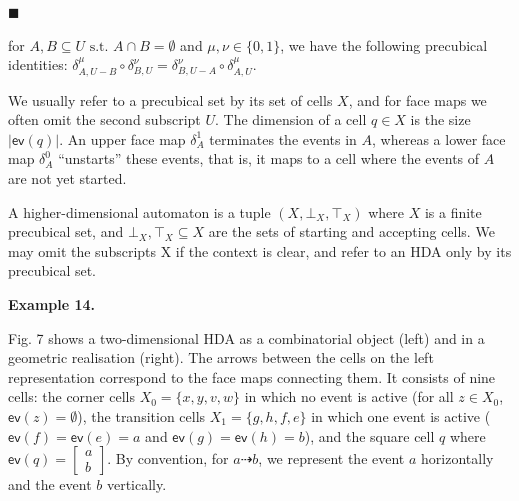 \documentclass[10pt,a4paper]{article}
\begin{document}
 
 
\par\noindent  $\blacksquare$ 
 
for $A,B\subseteq U\text{ s.t.\ }A\cap B=\emptyset$ and $\mu,\nu\in{\{0,1\}}$, we have the following precubical identities: $\delta_{A,U-B}^{\mu}\circ\delta_{B,U}^{\nu}=\delta_{B,U-A}^{\nu}\circ\delta_{A,U}^{\mu}$.\par
 
 
  
We usually refer to a precubical set by its set of cells $X$, and for face maps we often omit the second subscript $U$. The dimension of a cell $q\in X$ is the size $|\mathsf{ev}(q)|$. An upper face map $\delta_{A}^{1}$ terminates the events in $A$, whereas a lower face map $\delta_{A}^{0}$ “unstarts” these events, that is, it maps to a cell where the events of $A$ are not yet started.\par
 
 
 
A higher-dimensional automaton is a tuple $(X,\bot_{X},\top_{X})$ where $X$ is a finite precubical set, and $\bot_{X},\top_{X}\subseteq X$ are the sets of starting and accepting cells. We may omit the subscripts X if the context is clear, and refer to an HDA only by its precubical set.\par
 
 
 
\par\medskip\noindent\textbf{Example 14.}\par
 
 
Fig. 7 shows a two-dimensional HDA as a combinatorial object (left) and in a geometric realisation (right). The arrows between the cells on the left representation correspond to the face maps connecting them. It consists of nine cells: the corner cells $X_{0}=\{x,y,v,w\}$ in which no event is active (for all $z\in X_{0}$, $\mathsf{ev}(z)=\emptyset$), the transition cells $X_{1}=\{g,h,f,e\}$ in which one event is active ($\mathsf{ev}(f)=\mathsf{ev}(e)=a$ and $\mathsf{ev}(g)=\mathsf{ev}(h)=b$), and the square cell $q$ where $\mathsf{ev}(q)=\left[\begin{smallmatrix}a\\
b\end{smallmatrix}\right]$. By convention, for $a\dashrightarrow b$, we represent the event $a$ horizontally and the event $b$ vertically.\par
 
\end{document}
